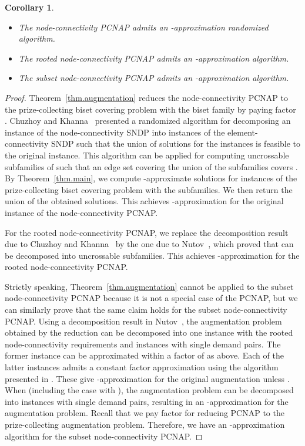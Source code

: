 \documentclass[11pt]{article}
\newtheorem{corollary}{Corollary}
\begin{document}
\begin{corollary}\label{cor.node}
\begin{itemize}
 \item[\rm (i)] The node-connectivity PCNAP admits an
	      -approximation randomized algorithm.
 \item[\rm (ii)] The rooted node-connectivity PCNAP admits an
	      -approximation algorithm.
 \item[\rm (iii)] The subset node-connectivity PCNAP admits an
	      -approximation algorithm.
\end{itemize}
 \end{corollary}
\begin{proof}
 Theorem~\ref{thm.augmentation}
 reduces the node-connectivity PCNAP
 to the prize-collecting biset covering problem with the biset family
  by paying factor .
 Chuzhoy and Khanna~\cite{ChuzhoyK12} presented a randomized algorithm
 for decomposing an instance of the node-connectivity SNDP into 
  instances of the element-connectivity SNDP such that
 the union of solutions for the  instances is 
 feasible to the original instance.
 This algorithm can be applied for
 computing   
 uncrossable subfamilies of 
 such that an edge set covering the union of the subfamilies
 covers .
 By Theorem~\ref{thm.main}, 
 we compute -approximate solutions for
 instances of 
 the prize-collecting biset covering problem 
 with the subfamilies. We then return the union of the obtained solutions.
 This achieves
 -approximation for the original instance
 of the node-connectivity PCNAP.

 For the rooted node-connectivity PCNAP, 
 we replace the decomposition result due to Chuzhoy and Khanna~\cite{ChuzhoyK12} by
 the one due to Nutov~\cite{Nutov12uncrossable}, which proved
 that 
 can be decomposed into  uncrossable subfamilies.
 This achieves -approximation for the rooted
 node-connectivity PCNAP.

 Strictly speaking,
 Theorem~\ref{thm.augmentation} cannot be applied to the subset
 node-connectivity PCNAP because it is not a special case of the PCNAP, 
 but we can similarly prove that the same claim holds for
 the subset node-connectivity PCNAP.
  Using a decomposition result in Nutov~\cite{Nutov12subset},
 the augmentation problem obtained by the reduction 
 can be decomposed into
 one instance with the rooted node-connectivity requirements and  instances  with single demand pairs.
 The former instance can be approximated within a factor of 
 as above.
 Each of the latter instances admits a constant factor approximation
 using the algorithm presented in \cite{Nutov13activation}.
 These give -approximation for the original augmentation unless . 
 When  (including the case with ), 
 the augmentation problem can be decomposed into  instances
 with single demand pairs, resulting in an -approximation for
 the augmentation problem.
 Recall that we pay factor  for reducing PCNAP to the
 prize-collecting augmentation problem.
 Therefore, we have an -approximation algorithm for the
 subset node-connectivity PCNAP.
\end{proof}
\end{document}
